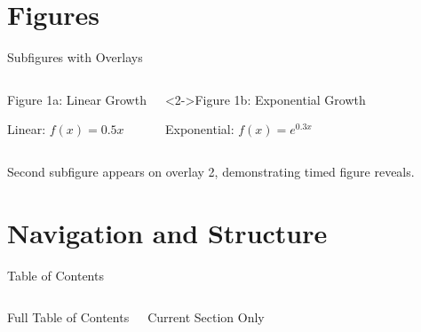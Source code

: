 \documentclass[doctype=beamer, beameraspectratio=169, beamertheme=Madrid, institution=generic]{omnilatex}
\begin{document}
\section{Figures}
\begin{frame}{Subfigures with Overlays}
  \begin{columns}[T]
    \begin{block}{Figure 1a: Linear Growth}
      \begin{center}
      \end{center}
      \centering\small Linear: $f(x) = 0.5x$
    \end{block}
    \begin{block}<2->{Figure 1b: Exponential Growth}
      \begin{center}
      \end{center}
      \centering\small Exponential: $f(x) = e^{0.3x}$
    \end{block}
  \end{columns}
  \begin{center}
    \small Second subfigure appears on overlay 2, demonstrating timed figure reveals.
  \end{center}
\end{frame}
\section{Navigation and Structure}
\begin{frame}{Table of Contents}
  \begin{columns}[T]
    \begin{block}{Full Table of Contents}
      \tableofcontents[hideallsubsections]
    \end{block}
    \begin{block}{Current Section Only}
    \end{block}
  \end{columns}
\end{frame}
\end{document}
